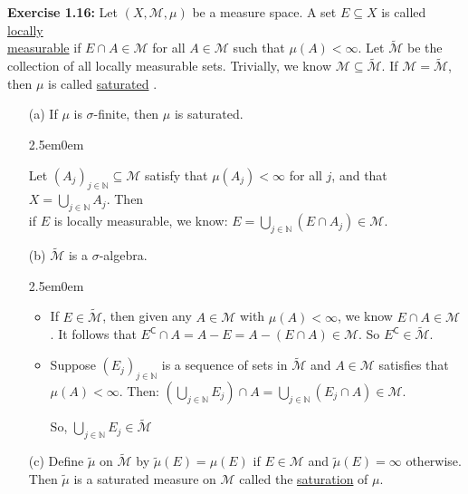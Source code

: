 \documentclass{book}
\newcommand{\exTwoP}{%
   \color{RedViolet}%
   \fontsize{13}{15}\selectfont%
}
\newenvironment{myIndent}{%
   \begin{adjustwidth}{2.5em}{0em}%
}{%
   \end{adjustwidth}%
}
\newcommand{\udefine}[1]{{%
   \setulcolor{Red}%
   \setul{0.14em}{0.07em}%
   \ul{#1}%
}}
\newcommand{\blab}[1]{\textbf{#1}}
\newcommand{\comp}{\mathsf{C}}
\newcommand{\retTwo}{\hfill\bigbreak}
\begin{document}
\blab{Exercise 1.16:} Let $(X, \mathcal{M}, \mu)$ be a measure space. A set $E \subseteq X$ is called \udefine{locally\\ measurable} if $E \cap A \in \mathcal{M}$ for all $A \in \mathcal{M}$ such that $\mu(A) < \infty$. Let $\widetilde{\mathcal{M}}$ be the\\ collection of all locally measurable sets. Trivially, we know $\mathcal{M} \subseteq \widetilde{\mathcal{M}}$. If $\mathcal{M} = \widetilde{\mathcal{M}}$,\\ then $\mu$ is called \udefine{saturated}.

\begin{enumerate}
   \item[(a)] If $\mu$ is $\sigma$-finite, then $\mu$ is saturated.
   
   \begin{myIndent}\exTwoP
      Let $(A_j)_{j \in \mathbb{N}} \subseteq \mathcal{M}$ satisfy that $\mu(A_j) < \infty$ for all $j$, and that $X = \bigcup\limits_{j\in\mathbb{N}}A_j$. Then\\ [-8pt] if $E$ is locally measurable, we know: $E = \bigcup\limits_{j \in \mathbb{N}}(E \cap A_j) \in \mathcal{M}$. 
   \end{myIndent}

   \item[(b)] $\widetilde{\mathcal{M}}$ is a $\sigma$-algebra.
   \begin{myIndent}\exTwoP
      \begin{itemize}
         \item If $E \in \widetilde{\mathcal{M}}$, then given any $A \in \mathcal{M}$ with $\mu(A) < \infty$, we know $E \cap A \in \mathcal{M}$. It follows that $E^\comp \cap A = A - E = A - (E \cap A) \in \mathcal{M}$. So $E^\comp \in \widetilde{\mathcal{M}}$.\\ [-8pt]
         \item Suppose $(E_j)_{j \in \mathbb{N}}$ is a sequence of sets in $\widetilde{\mathcal{M}}$ and $A \in \mathcal{M}$ satisfies that\\ $\mu(A) < \infty$. Then: $(\bigcup\limits_{j \in \mathbb{N}}E_j) \cap A = \bigcup\limits_{j \in \mathbb{N}}(E_j \cap A) \in \mathcal{M}$.\retTwo

         So, $\bigcup\limits_{j \in \mathbb{N}}E_j \in \widetilde{\mathcal{M}}$
      \end{itemize}
   \end{myIndent}

   \item[(c)] Define $\widetilde{\mu}$ on $\widetilde{\mathcal{M}}$ by $\widetilde{\mu}(E) = \mu(E)$ if $E \in \mathcal{M}$ and $\widetilde{\mu}(E) = \infty$ otherwise. Then $\widetilde{\mu}$ is a saturated measure on $\mathcal{M}$ called the \udefine{saturation} of $\mu$.
   

\end{enumerate}
\end{document}
